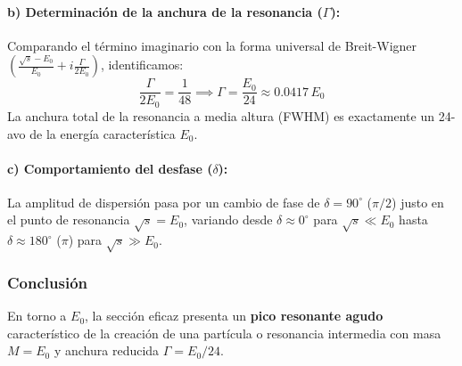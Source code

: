 \begin{problema}
\paragraph{b) Determinación de la anchura de la resonancia ($\Gamma$):}
Comparando el término imaginario con la forma universal de Breit-Wigner $\left( \frac{\sqrt{s}-E_0}{E_0} + i \frac{\Gamma}{2E_0} \right)$, identificamos:
\begin{equation*}
\frac{\Gamma}{2 E_0} = \frac{1}{48} \implies \Gamma = \frac{E_0}{24} \approx 0.0417 \, E_0
\end{equation*}
La anchura total de la resonancia a media altura (FWHM) es exactamente un 24-avo de la energía característica $E_0$.

\paragraph{c) Comportamiento del desfase ($\delta$):}
La amplitud de dispersión pasa por un cambio de fase de $\delta = 90^\circ$ ($\pi/2$) justo en el punto de resonancia $\sqrt{s} = E_0$, variando desde $\delta \approx 0^\circ$ para $\sqrt{s} \ll E_0$ hasta $\delta \approx 180^\circ$ ($\pi$) para $\sqrt{s} \gg E_0$.

\subsubsection*{Conclusión}
En torno a $E_0$, la sección eficaz presenta un \textbf{pico resonante agudo} característico de la creación de una partícula o resonancia intermedia con masa $M = E_0$ y anchura reducida $\Gamma = E_0 / 24$.
\end{problema}

